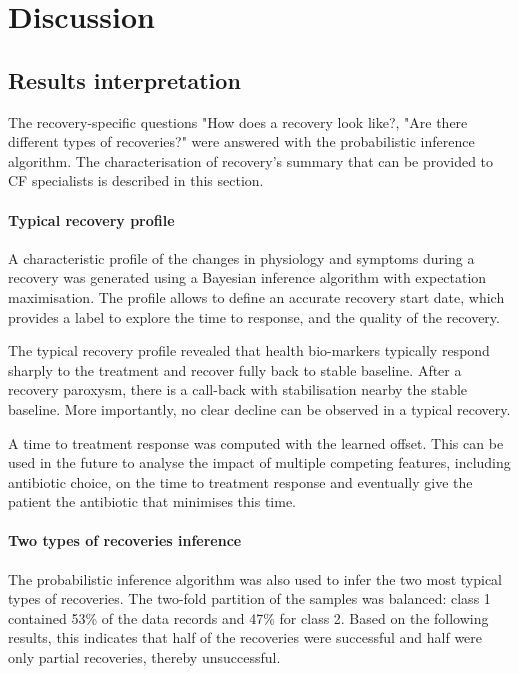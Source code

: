\chapter{Discussion}

\section{Results interpretation}
The recovery-specific questions "How does a recovery look like?, "Are there different types of recoveries?" were answered with the probabilistic inference algorithm. The characterisation of recovery's summary that can be provided to CF specialists is described in this section.

\subsubsection{Typical recovery profile}
A characteristic profile of the changes in physiology and symptoms during a recovery was generated using a Bayesian inference algorithm with expectation maximisation. The profile allows to define an accurate recovery start date, which provides a label to explore the time to response, and the quality of the recovery.

The typical recovery profile revealed that health bio-markers typically respond sharply to the treatment and recover fully back to stable baseline. After a recovery paroxysm, there is a call-back with stabilisation nearby the stable baseline. More importantly, no clear decline can be observed in a typical recovery.

A time to treatment response was computed with the learned offset. This can be used in the future to analyse the impact of multiple competing features, including antibiotic choice, on the time to treatment response and eventually give the patient the antibiotic that minimises this time.

\subsubsection{Two types of recoveries inference}
The probabilistic inference algorithm was also used to infer the two most typical types of recoveries. The two-fold partition of the samples was balanced: class 1 contained 53\% of the data records and 47\% for class 2. Based on the following results, this indicates that half of the recoveries were successful and half were only partial recoveries, thereby unsuccessful.

